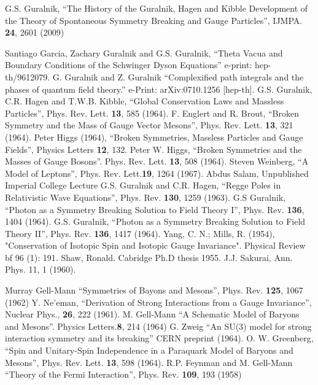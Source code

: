 \documentclass[preprintnumbers,12pt]{revtex4-2}
\begin{document}
\bigskip %
\begin{thebibliography}{99}
 G.S. Guralnik, ``The History of the Guralnik, Hagen and
  Kibble Development of the Theory of Spontaneous Symmetry Breaking and Gauge
  Particles'', IJMPA. {\bf 24}, 2601 (2009)

 Santiago Garcia, Zachary Guralnik and G.S. Guralnik, ``Theta
  Vacua and Boundary Conditions of the Schwinger Dyson Equations'' e-print:
  hep-th/9612079.
 G. Guralnik and Z. Guralnik ``Complexified path integrals
  and the phases of quantum field theory.'' e-Print: arXiv:0710.1256 [hep-th].
 G.S. Guralnik, C.R. Hagen and T.W.B. Kibble, ``Global
  Conservation Laws and Massless Particles'',  Phys. Rev. Lett. {\bf 13}, 585 (1964).
 F. Englert and R. Brout, ``Broken Symmetry and the Mass of
  Gauge Vector Mesons'', Phys. Rev. Lett. {\bf 13}, 321 (1964).
 Peter Higgs (1964), ``Broken Symmetries, Massless Particles
  and Gauge Fields'', Physics Letters {\bf 12}, 132.
 Peter W. Higgs, ``Broken Symmetries and the Masses of Gauge
  Bosons''. Phys. Rev. Lett. {\bf 13}, 508 (1964).
 Steven Weinberg, ``A Model of Leptons'', Phys. Rev. Lett.{\bf 19}, 1264
  (1967).
 Abdus Salam, Unpublished Imperial College Lecture
  G.S. Guralnik and C.R. Hagen, ``Regge Poles in Relativistic
  Wave Equations'', Phys. Rev. {\bf 130}, 1259 (1963).
 G.S Guralnik, ``Photon as a Symmetry Breaking Solution to
  Field Theory I'', Phys. Rev. {\bf 136}, 1404 (1964).
 G.S. Guralnik, ``Photon as a Symmetry Breaking Solution to
  Field Theory II'', Phys. Rev. {\bf 136}, 1417 (1964).
 Yang, C. N.; Mills, R. (1954), "Conservation of Isotopic Spin and
 Isotopic Gauge Invariance". Physical Review {bf 96 }(1): 191.
 Shaw, Ronald. Cabridge Ph.D thesis 1955.
 J.J. Sakurai, Ann. Phys. 11, 1 (1960).

 Murray Gell-Mann ``Symmetries of Bayons and Mesons'', Phys. Rev. {\bf 125}, 1067 (1962)
 Y. Ne'eman, ``Derivation of Strong Interactions from
  a Gauge Invariance'', Nuclear Phys., {\bf 26}, 222 (1961).
 M. Gell-Mann ``A Schematic Model of Baryons and Mesons''. Physics Letters.{\bf 8}, 214 (1964)
 G. Zweig ``An SU(3) model for strong interaction
  symmetry and its breaking'' CERN preprint (1964).
 O. W. Greenberg, ``Spin and Unitary-Spin Independence in a
  Paraquark Model of Baryons and Mesons'', Phys. Rev. Lett. {\bf 13}, 598 (1964).
 R.P. Feynman and M. Gell-Mann ``Theory of the Fermi Interaction'',
Phys. Rev. {\bf 109}, 193 (1958)


\end{thebibliography}
\end{document}
